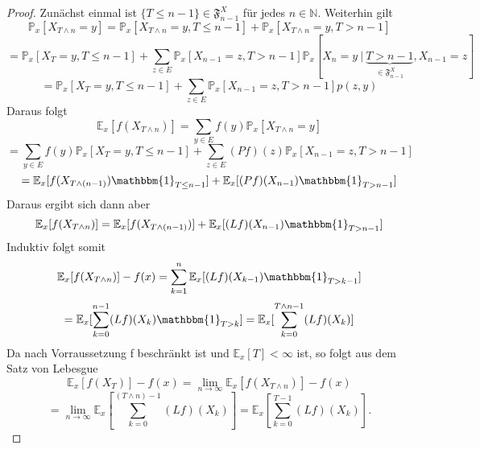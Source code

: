 \documentclass[a4paper,12pt]{scrartcl}
\theoremstyle{definition}
\begin{document}
\begin{proof}
Zunächst einmal ist $\lbrace T \leq n-1 \rbrace \in \mathfrak{F}_{n-1}^{X}$ für jedes $n \in \mathbb{N}$. Weiterhin gilt 
\begin{equation*}
\mathbb{P}_{x}[X_{T \wedge n} = y] = \mathbb{P}_{x}[X_{T \wedge n} = y, T \leq n - 1] + \mathbb{P}_{x}[X_{T \wedge n} = y, T > n - 1]
\end{equation*}
\begin{equation*}
= \mathbb{P}_{x}[X_{T} = y, T \leq n-1] + \sum_{z \in E} \mathbb{P}_{x}[X_{n-1}=z, T > n-1]\mathbb{P}_{x}[X_{n}=y \:| \: \underbrace{T > n-1}_{\in \mathfrak{F}_{n-1}^{X}}, X_{n-1} = z]
\end{equation*}
\begin{equation*}
= \mathbb{P}_{x}[X_{T} = y, T \leq n-1] + \sum_{z \in E} \mathbb{P}_{x}[X_{n-1}=z, T > n-1]p(z,y)
\end{equation*}
Daraus folgt
\begin{equation*}
\mathbb{E}_{x}[f(X_{T \wedge n})] = \sum_{y \in E} f(y) \mathbb{P}_{x}[X_{T \wedge n}=y]
\end{equation*}
\begin{equation*}
= \sum_{y \in E} f(y) \mathbb{P}_{x}[X_{T} = y, T \leq n-1] + \sum_{z \in E} (Pf)(z) \mathbb{P}_{x}[X_{n-1}=z, T > n-1]
\end{equation*}
\begin{equation*}
= \mathbb{E}_{x}[f(X_{T \wedge (n-1)}) \mathbbm{1}_{T \leq n-1}] + \mathbb{E}_{x}[(Pf)(X_{n-1})\mathbbm{1}_{T > n-1}]
\end{equation*}
Daraus ergibt sich dann aber
\begin{equation*}
\mathbb{E}_{x}[f(X_{T \wedge n})] = \mathbb{E}_{x}[f(X_{T \wedge (n-1)})] + \mathbb{E}_{x}[(Lf)(X_{n-1})\mathbbm{1}_{T > n-1}]
\end{equation*}
Induktiv folgt somit
\begin{equation*}
\mathbb{E}_{x}[f(X_{T \wedge n})] - f(x) = \sum_{k=1}^{n} \mathbb{E}_{x}[(Lf)(X_{k-1})\mathbbm{1}_{T > k-1}]
\end{equation*}
\begin{equation*}
= \mathbb{E}_{x}[\sum_{k=0}^{n-1} (Lf)(X_{k})\mathbbm{1}_{T > k}] = \mathbb{E}_{x}[\sum_{k=0}^{T \wedge n-1} (Lf)(X_{k})]
\end{equation*}
Da nach Vorraussetzung f beschränkt ist und $\mathbb{E}_{x}[T]<\infty$ ist, so folgt aus dem Satz von Lebesgue
\begin{equation*}
\mathbb{E}_{x}[f(X_{T})] - f(x) = \lim_{n \to \infty} \mathbb{E}_{x}[f(X_{T \wedge n})] - f(x)
\end{equation*}
\begin{equation*}
= \lim_{n \to \infty} \mathbb{E}_{x}[\sum_{k=0}^{(T \wedge n)-1} (Lf)(X_{k})] =  \mathbb{E}_{x}[\sum_{k=0}^{T-1} (Lf)(X_{k})].
\end{equation*}
\end{proof}
\end{document}
